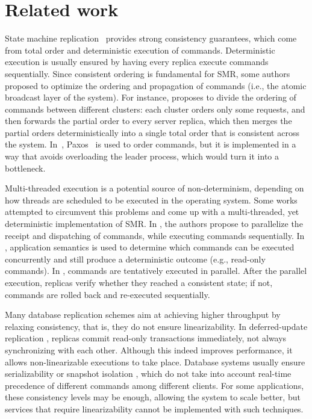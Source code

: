 \section{Related work}
\label{sec:rw}

State machine replication~\cite{Lam78, Sch90, Kapritsos:2012um, kotla2004htbft, santos2013htsmr} provides strong consistency guarantees, which come from total order and deterministic execution of commands.
Deterministic execution is usually ensured by having every replica execute commands sequentially.
Since consistent ordering is fundamental for SMR, some authors proposed to optimize the ordering and propagation of commands (i.e., the atomic broadcast layer of the system).
For instance, \cite{kapritsos2010scalable} proposes to divide the ordering of commands between different clusters: each cluster orders only some requests, and then forwards the partial order to every server replica, which then merges the partial orders deterministically into a single total order that is consistent across the system.
In~\cite{biely2012spaxos}, Paxos~\cite{Lamport:1998ea} is used to order commands, but it is implemented in a way that avoids overloading the leader process, which would turn it into a bottleneck.

Multi-threaded execution is a potential source of non-determinism, depending on how threads are scheduled to be executed in the operating system.
Some works attempted to circumvent this problems and come up with a multi-threaded, yet deterministic implementation of SMR.
In \cite{santos2013htsmr}, the authors propose to parallelize the receipt and dispatching of commands, while executing commands sequentially.
In \cite{kotla2004htbft}, application semantics is used to determine which commands can be executed concurrently and still produce a deterministic outcome (e.g., read-only commands).
In \cite{Kapritsos:2012um}, commands are tentatively executed in parallel.
After the parallel execution, replicas verify whether they reached a consistent state; if not, commands are rolled back and re-executed sequentially.

Many database replication schemes aim at achieving higher throughput by relaxing consistency, that is, they do not ensure linearizability.
In deferred-update replication \cite{sciascia2012sdur, chundi96dur, kobus2013hybrid, SousaOMP01}, replicas commit read-only transactions immediately, not always synchronizing with each other.
Although this indeed improves performance, it allows non-linearizable executions to take place.
Database systems usually ensure serializability \cite{BHG87} or snapshot isolation \cite{LinKJPA09}, which do not take into account real-time precedence of different commands among different clients. 
For some applications, these consistency levels may be enough, allowing the system to scale better, but services that require linearizability cannot be implemented with such techniques.

